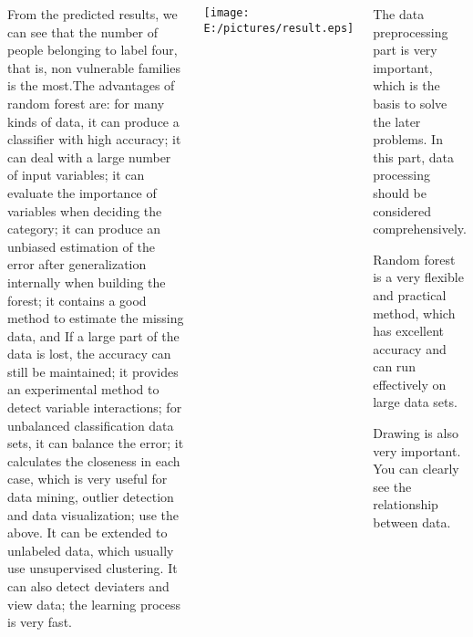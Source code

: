 \documentclass{tikzposter} %
\begin{document}
\begin{columns}
{
  From the predicted results, we can see that the number of people belonging to label four, that is, non vulnerable families is the 
most.The advantages of random forest are: for many kinds of data, it can produce a classifier with high accuracy; it can deal with a large number of input variables; it can evaluate the importance of variables when deciding the category; it can produce an unbiased estimation of the error after generalization internally when building the forest; it contains a good method to estimate the missing data, and If a large part of the data is lost, the accuracy can still be maintained; it provides an experimental method to detect variable interactions; for unbalanced classification data sets, it can balance the error; it calculates the closeness in each case, which is very useful for data mining, outlier detection and data visualization; use the above. It can be extended to unlabeled data, which usually use unsupervised clustering. It can also detect deviaters and view data; the learning process is very fast.
\vspace{2cm}
  \begin{center}
    \texttt{[image: E:/pictures/result.eps]}
  \end{center}
}


{
  \begin{description}
    \item The data preprocessing part is very important, which is the basis to solve the later problems. In this part, data processing should be considered comprehensively.
    \vspace{1cm}
    \item Random forest is a very flexible and practical method, which has excellent accuracy and can run effectively on large data sets. 
    \vspace{1cm}
    \item Drawing is also very important. You can clearly see the relationship between data.
  \end{description}
}



\end{columns}
\end{document}
